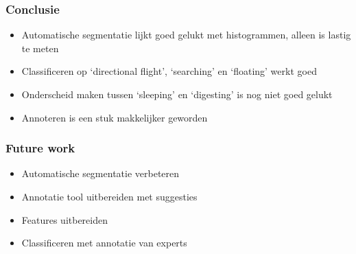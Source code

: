 \documentclass{beamer}
\newcommand{\slide}[2]
{
\begin{frame}
\frametitle{#1} 

#2

\end{frame}
}
\begin{document}
\slide{Conclusie}
{
\begin{itemize}
	\item Automatische segmentatie lijkt goed gelukt met histogrammen, alleen is lastig te meten
	\item Classificeren op `directional flight', `searching' en `floating' werkt goed
	\item Onderscheid maken tussen `sleeping' en `digesting' is nog niet goed gelukt
	\item Annoteren is een stuk makkelijker geworden
\end{itemize} 
}

\slide{Future work}
{
\begin{itemize}
	\item Automatische segmentatie verbeteren
	\item Annotatie tool uitbereiden met suggesties
	\item Features uitbereiden
	\item Classificeren met annotatie van experts
\end{itemize} 
}
\end{document}
